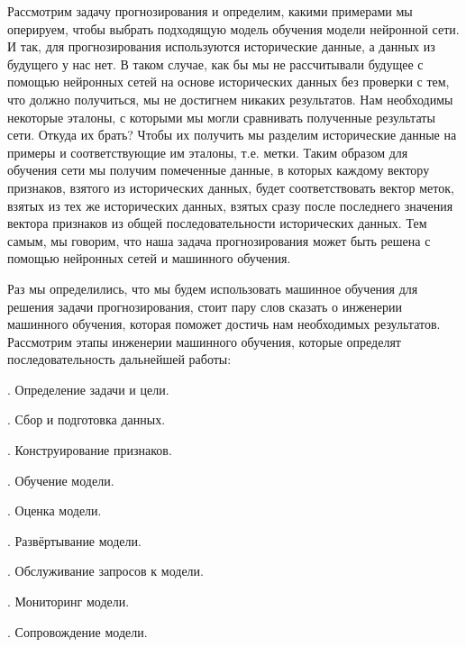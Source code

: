 {  \par \redline	Рассмотрим задачу прогнозирования и определим, какими примерами мы оперируем, чтобы выбрать подходящую модель обучения модели нейронной сети. И так, для прогнозирования используются исторические данные, а данных из будущего у нас нет. В таком случае, как бы мы не рассчитывали будущее с помощью нейронных сетей на основе исторических данных без проверки с тем, что должно получиться, мы не достигнем никаких результатов. Нам необходимы некоторые эталоны, с которыми мы могли сравнивать полученные результаты сети. Откуда их брать? Чтобы их получить мы разделим исторические данные на примеры и соответствующие им эталоны, т.е. метки. Таким образом для обучения сети мы получим помеченные данные, в которых каждому вектору признаков, взятого из исторических данных, будет соответствовать вектор меток, взятых из тех же исторических данных, взятых сразу после последнего значения вектора признаков из общей последовательности исторических данных. Тем самым, мы говорим, что наша задача прогнозирования может быть решена с помощью нейронных сетей и машинного обучения.

  \par \redline Раз мы определились, что мы будем использовать машинное обучения для решения задачи прогнозирования, стоит пару слов сказать о инженерии машинного обучения, которая поможет достичь нам необходимых результатов. Рассмотрим этапы инженерии машинного обучения, которые определят последовательность дальнейшей работы:

  \par {}. Определение задачи и цели.
  \par {}. Сбор и подготовка данных.
  \par {}. Конструирование признаков.
  \par {}. Обучение модели.
  \par {}. Оценка модели.
  \par {}. Развёртывание модели.
  \par {}. Обслуживание запросов к модели.
  \par {}. Мониторинг модели.
  \par {}. Сопровождение модели.

}
